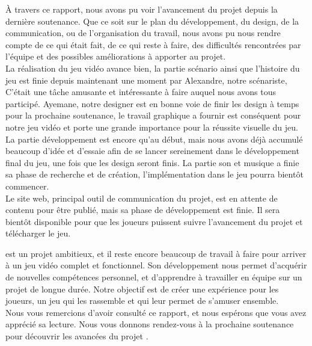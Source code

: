 

À travers ce rapport, nous avons pu voir l'avancement du projet \gameName depuis la dernière soutenance.
Que ce soit sur le plan du développement, du design, de la communication, ou de l'organisation du travail, nous avons pu nous rendre compte de ce qui était fait, de ce qui reste à faire, des difficultés rencontrées par l'équipe et des possibles améliorations à apporter au projet.
\\

La réalisation du jeu vidéo avance bien, la partie scénario ainsi que l'histoire du jeu est finie depuis maintenant une moment par Alexandre, notre scénariste,
C'était une tâche amusante et intéressante à faire auquel nous avons tous participé. 
Ayemane, notre designer est en bonne voie de finir les design à temps pour la prochaine soutenance, le travail graphique a fournir est conséquent pour notre jeu vidéo et porte une grande importance pour la réussite visuelle du jeu.
La partie développement est encore qu'au début, mais nous avons déjà accumulé beaucoup d'idée et d'essaie afin de se lancer sereinement dans le développement final du jeu, une fois que les design seront finis.
La partie son et musique a finie sa phase de recherche et de création, l'implémentation dans le jeu pourra bientôt commencer.
\\

Le site web, principal outil de communication du projet, est en attente de contenu pour être publié, mais sa phase de développement est finie.
Il sera bientôt disponible pour que les joueurs puissent suivre l'avancement du projet et télécharger le jeu.


\gameName est un projet ambitieux, et il reste encore beaucoup de travail à faire pour arriver à un jeu vidéo complet et fonctionnel.
Son développement nous permet d'acquérir de nouvelles compétences personnel, et d'apprendre à travailler en équipe sur un projet de longue durée.
Notre objectif est de créer une expérience pour les joueurs, un jeu qui les rassemble et qui leur permet de s'amuser ensemble.
\\


Nous vous remercions d'avoir consulté ce rapport, et nous espérons que vous avez apprécié sa lecture.
Nous vous donnons rendez-vous à la prochaine soutenance pour découvrir les avancées du projet \gameName.
